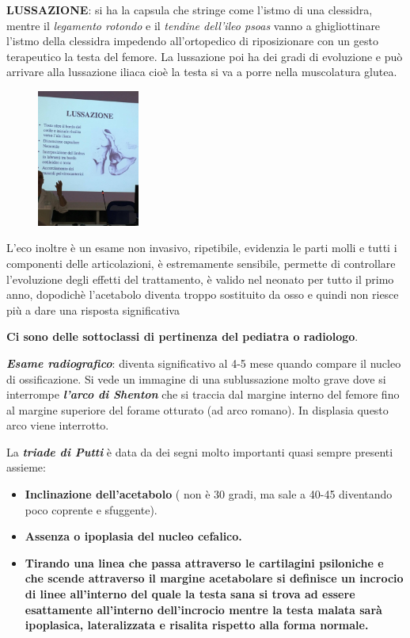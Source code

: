 \textbf{LUSSAZIONE}: si ha la capsula che stringe come l'istmo di una clessidra, mentre il \emph{legamento rotondo} e il \emph{tendine dell'ileo psoas} vanno a ghigliottinare l'istmo della clessidra impedendo all'ortopedico di riposizionare con un gesto terapeutico la testa del femore. La lussazione poi ha dei gradi di evoluzione e può arrivare alla lussazione iliaca cioè la testa si va a porre nella muscolatura glutea.

\begin{figure}[!ht]
\centering
\includegraphics[width=0.3\textwidth]{018/image12.jpeg}
\end{figure}

L'eco inoltre è un esame non invasivo, ripetibile, evidenzia le parti molli e tutti i componenti delle articolazioni, è estremamente sensibile, permette di controllare l'evoluzione degli effetti del trattamento, è valido nel neonato per tutto il primo anno, dopodichè
l'acetabolo diventa troppo sostituito da osso e quindi non riesce più a dare una risposta significativa

\textbf{Ci sono delle sottoclassi di pertinenza del pediatra o radiologo}.

\textbf{\emph{Esame radiografico}}: diventa significativo al 4-5 mese quando compare il nucleo di ossificazione. Si vede un immagine di una sublussazione molto grave dove si interrompe \emph{\textbf{l'arco di Shenton}} che si traccia dal margine interno del femore fino al margine
superiore del forame otturato (ad arco romano). In displasia questo arco viene interrotto.

La \emph{\textbf{\emph{triade di Putti}}} è data da dei segni molto importanti quasi sempre presenti assieme:
\begin{itemize}
\item \textbf{Inclinazione dell'acetabolo} ( non è 30 gradi, ma sale a 40-45 diventando poco coprente e sfuggente).
\item \textbf{Assenza o ipoplasia del nucleo cefalico. }
\item \textbf{Tirando una linea che passa attraverso le cartilagini psiloniche e che scende attraverso il margine acetabolare si definisce un incrocio di linee all'interno del quale la testa sana si trova ad essere esattamente all'interno dell'incrocio mentre la testa malata
sarà ipoplasica, lateralizzata e risalita rispetto alla forma normale.}
\end{itemize}

